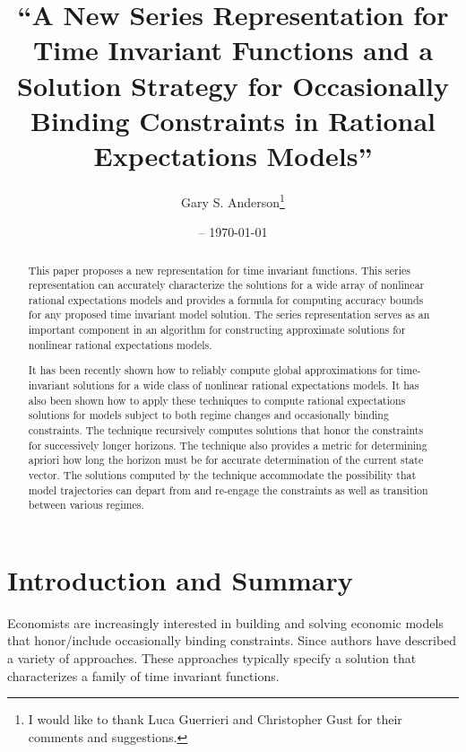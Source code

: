 \documentclass[12pt]{article}
\title{``A New Series Representation for Time Invariant Functions and
a Solution Strategy for Occasionally Binding Constraints in Rational Expectations Models''}
\date{\currenttime -- \today }
\author{Gary S. Anderson\thanks{I would like to thank Luca Guerrieri and Christopher Gust for their comments and suggestions.}}
\begin{document}
\maketitle

\begin{abstract}


 
This paper proposes a new representation for time invariant functions.
This series representation 
can accurately characterize the solutions for a 
wide array of nonlinear rational expectations models 
and provides a formula
for computing accuracy bounds for any proposed time invariant model solution.
The series representation serves as an important component in an algorithm 
for constructing approximate solutions for nonlinear rational expectations
models.


It has been recently shown how to reliably compute global approximations for time-invariant solutions for a wide class of nonlinear rational expectations models. It has also been shown how to apply these techniques to compute rational expectations solutions for models subject to both regime changes and occasionally binding constraints.  The technique recursively computes  solutions that honor the constraints for successively longer horizons. The technique also provides a metric for determining apriori how long the horizon must be for accurate determination of the current state vector. The solutions computed by the technique accommodate the possibility that model trajectories can depart from and re-engage the constraints as well as transition between various regimes.



\end{abstract}

 \newpage
 \tableofcontents
 \newpage


\section{Introduction and Summary}

Economists are increasingly interested in building and solving 
economic models that honor/include occasionally binding constraints.
Since \cite{Christiano2000} authors have described a 
variety of approaches.\cite{holden15:_exist_dsge,guerrieri15:_occbin,benigno09,hintermaier10,brumm10,nakov08,haefke98,nakata12,gordon11,billi11,Hintermaier2010,Guerrieri2015}
These approaches typically specify a solution that characterizes a family of
time invariant functions.
\end{document}
